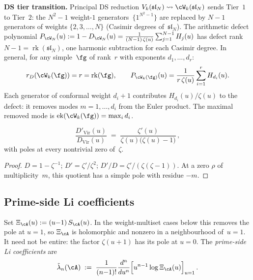 \begin{computation}
\smallskip
\noindent\textbf{DS tier transition.}
Principal DS reduction
$V_k(\mathfrak{sl}_N) \leadsto \cW_k(\mathfrak{sl}_N)$
sends Tier~$1$ to Tier~$2$:
the $N^2 - 1$ weight-$1$ generators~$\{1^{N^2-1}\}$
are replaced by $N - 1$ generators of weights
$\{2, 3, \ldots, N\}$
(Casimir degrees of~$\mathfrak{sl}_N$).
The arithmetic defect polynomial
$P_{\cW_N}(u) := 1 - D_{\cW_N}(u)
= \frac{1}{(N{-}1)\,\zeta(u)}\sum_{j=1}^{N-1} H_j(u)$
has defect rank~$N - 1 = \operatorname{rk}(\mathfrak{sl}_N)$,
one harmonic subtraction for each Casimir degree.
In general, for any simple~$\fg$ of rank~$r$
with exponents $d_1,\ldots,d_r$:
\begin{equation}\label{eq:ds-defect-degree}
r_D(\cW_k(\fg)) = r = \operatorname{rk}(\fg),
\qquad
P_{\cW_k(\fg)}(u) =
\frac{1}{r\,\zeta(u)}\sum_{i=1}^{r} H_{d_i}(u).
\end{equation}
Each generator of conformal weight $d_i + 1$ contributes
$H_{d_i}(u)/\zeta(u)$
to the defect: it removes modes $m = 1, \ldots, d_i$
from the Euler product. The maximal removed mode is
$\operatorname{ek}(\cW_k(\fg))=\max_i d_i$.
\end{computation}

\begin{proposition}[\ClaimStatusProvedHere]%
\label{prop:zeta-zeros-defect-derivative}%
%
\begin{equation}\label{eq:defect-derivative}
\frac{D'_{\mathrm{Vir}}(u)}{D_{\mathrm{Vir}}(u)}
\;=\;
\frac{\zeta'(u)}{\zeta(u)\bigl(\zeta(u) - 1\bigr)}\,,
\end{equation}
with poles at every nontrivial zero of~$\zeta$.
\end{proposition}

\begin{proof}
$D = 1 - \zeta^{-1}$;
$D' = \zeta'/\zeta^2$;
$D'/D = \zeta'/(\zeta(\zeta-1))$.
At a zero $\rho$ of multiplicity~$m$, this quotient has a simple pole
with residue $-m$.
\end{proof}

\subsection{Prime-side Li coefficients}%
\label{subsec:prime-side-li}%

\begin{definition}%
\label{def:prime-side-li}%
%
Set $\Xi_\cA(u) := (u{-}1)\,S_\cA(u)$. In the weight-multiset cases
below this removes the pole at $u=1$, so $\Xi_\cA$ is holomorphic and
nonzero in a neighbourhood of~$u=1$. It need not be entire: the
factor $\zeta(u{+}1)$ has its pole at $u=0$.
The \emph{prime-side Li coefficients} are
\begin{equation}\label{eq:prime-side-li}
\tilde\lambda_n(\cA)
\;:=\;
\frac{1}{(n{-}1)!}
\frac{d^n}{du^n}
\Bigl[u^{n-1}\log\Xi_\cA(u)\Bigr]_{u=1}\,.
\end{equation}
\end{definition}


